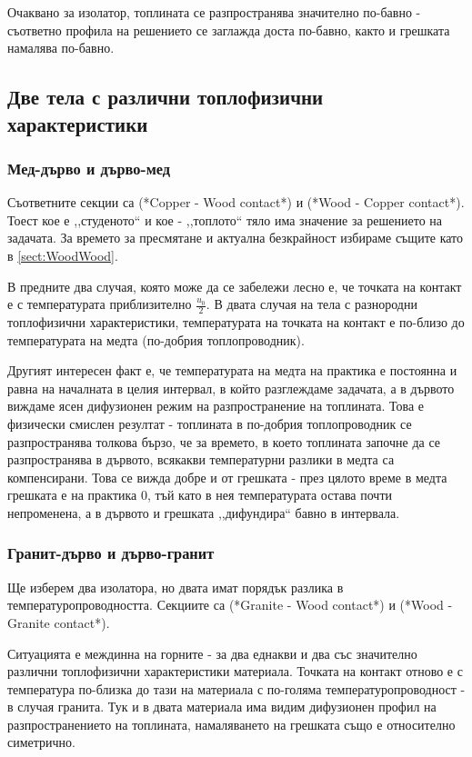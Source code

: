 Очаквано за изолатор, топлината се разпространява значително по-бавно - съответно профила на решението се заглажда доста по-бавно, както и грешката
намалява по-бавно.

\subsection{Две тела с различни топлофизични характеристики}

\subsubsection{Мед-дърво и дърво-мед}
Съответните секции са \textcolor{comment}{(*Copper - Wood contact*)} и \textcolor{comment}{(*Wood - Copper contact*)}. 
Тоест кое е ,,студеното`` и кое - ,,топлото`` тяло има значение за решението на задачата.
За времето за пресмятане и актуална безкрайност избираме същите като в \autoref{sect:WoodWood}. 

В предните два случая, която може да се забележи лесно е, че точката на контакт е с температурата приблизително $\frac{u_0}{2}$. В двата случая на тела с разнородни топлофизични характеристики,
температурата на точката на контакт е по-близо до температурата на медта (по-добрия топлопроводник). 

Другият интересен факт е, че температурата на медта на практика е постоянна и равна на началната в целия интервал, в който разглеждаме задачата, а в дървото виждаме ясен дифузионен режим на разпространение на топлината.
Това е физически смислен резултат - топлината в по-добрия топлопроводник се разпространява толкова бързо, че за времето, в което топлината започне да се разпространява
в дървото, всякакви температурни разлики в медта са компенсирани.
Това се вижда добре и от грешката - през цялото време в медта грешката е на практика 0, тъй като в нея температурата остава почти непроменена, а в дървото и грешката ,,дифундира`` бавно в интервала.

\subsubsection{Гранит-дърво и дърво-гранит}
Ще изберем два изолатора, но двата имат порядък разлика в температуропроводността. Секциите са \textcolor{comment}{(*Granite - Wood contact*)} и \textcolor{comment}{(*Wood - Granite contact*)}.

Ситуацията е междинна на горните - за два еднакви и два със значително различни топлофизични характеристики материала. Точката на контакт отново е с температура по-близка до тази на материала с по-голяма температуропроводност - в случая гранита.
Тук и в двата материала има видим дифузионен профил на разпространението на топлината, намаляването на грешката също е относително симетрично. 

